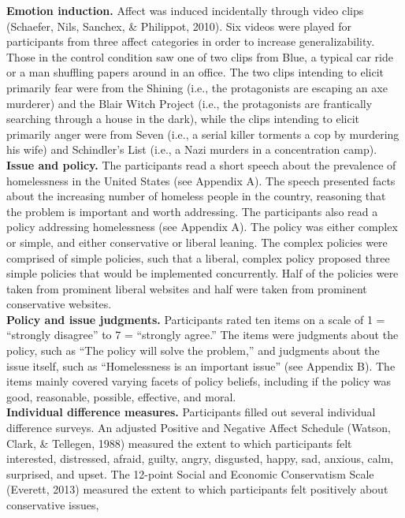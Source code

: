 \documentclass[man,draftall]{apa6}
\begin{document}
\textbf{Emotion induction.} Affect was induced incidentally through
video clips (Schaefer, Nils, Sanchex, \& Philippot, 2010). Six videos
were played for participants from three affect categories in order to
increase generalizability. Those in the control condition saw one of two
clips from Blue, a typical car ride or a man shuffling papers around in
an office. The two clips intending to elicit primarily fear were from
the Shining (i.e., the protagonists are escaping an axe murderer) and
the Blair Witch Project (i.e., the protagonists are frantically
searching through a house in the dark), while the clips intending to
elicit primarily anger were from Seven (i.e., a serial killer torments a
cop by murdering his wife) and Schindler's List (i.e., a Nazi murders in
a concentration camp).\\
\textbf{Issue and policy.} The participants read a short speech about
the prevalence of homelessness in the United States (see Appendix A).
The speech presented facts about the increasing number of homeless
people in the country, reasoning that the problem is important and worth
addressing. The participants also read a policy addressing homelessness
(see Appendix A). The policy was either complex or simple, and either
conservative or liberal leaning. The complex policies were comprised of
simple policies, such that a liberal, complex policy proposed three
simple policies that would be implemented concurrently. Half of the
policies were taken from prominent liberal websites and half were taken
from prominent conservative websites.\\
\textbf{Policy and issue judgments.} Participants rated ten items on a
scale of 1 = \enquote{strongly disagree} to 7 = \enquote{strongly
agree.} The items were judgments about the policy, such as \enquote{The
policy will solve the problem,} and judgments about the issue itself,
such as \enquote{Homelessness is an important issue} (see Appendix B).
The items mainly covered varying facets of policy beliefs, including if
the policy was good, reasonable, possible, effective, and moral.\\
\textbf{Individual difference measures.} Participants filled out several
individual difference surveys. An adjusted Positive and Negative Affect
Schedule (Watson, Clark, \& Tellegen, 1988) measured the extent to which
participants felt interested, distressed, afraid, guilty, angry,
disgusted, happy, sad, anxious, calm, surprised, and upset. The 12-point
Social and Economic Conservatism Scale (Everett, 2013) measured the
extent to which participants felt positively about conservative issues,
\end{document}
